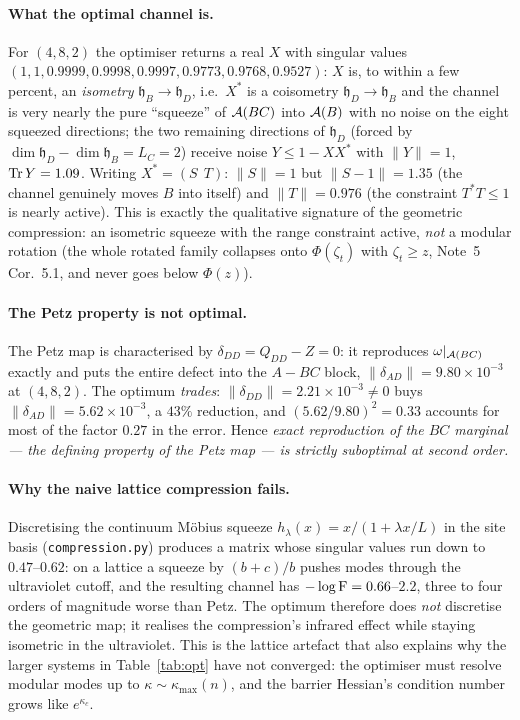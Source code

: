 \documentclass[11pt]{article}
\newcommand{\hh}{\mathfrak h}
\begin{document}
\paragraph{What the optimal channel is.}
For \((4,8,2)\) the optimiser returns a real \(X\) with singular values
\((1,1,0.9999,0.9998,0.9997,0.9773,0.9768,0.9527)\): \(X\) is, to within a few
percent, an \emph{isometry} \(\hh_B\to\hh_D\), i.e.\ \(X^*\) is a coisometry
\(\hh_D\to\hh_B\) and the channel is very nearly the pure ``squeeze'' of
\(\mathcal A(BC)\) into \(\mathcal A(B)\) with no noise on the eight squeezed directions;
the two remaining directions of \(\hh_D\) (forced by
\(\dim\hh_D-\dim\hh_B=L_C=2\)) receive noise \(Y\le1-XX^*\) with \(\|Y\|=1\),
\(\operatorname{Tr} Y=1.09\).  Writing \(X^*=(S\ \ T)\): \(\|S\|=1\) but
\(\|S-1\|=1.35\) (the channel genuinely moves \(B\) into itself) and
\(\|T\|=0.976\) (the constraint \(T^*T\le1\) is nearly active).  This is exactly
the qualitative signature of the geometric compression: an isometric squeeze
with the range constraint active, \emph{not} a modular rotation (the whole
rotated family collapses onto \(\Phi(\zeta_t)\) with \(\zeta_t\ge z\), Note~5
Cor.~5.1, and never goes below \(\Phi(z)\)).

\paragraph{The Petz property is not optimal.}
The Petz map is characterised by \(\delta_{DD}=Q_{DD}-Z=0\): it reproduces
\(\omega|_{\mathcal A(BC)}\) exactly and puts the entire defect into the \(A\!-\!BC\)
block, \(\|\delta_{AD}\|=9.80\times10^{-3}\) at \((4,8,2)\).  The optimum
\emph{trades}: \(\|\delta_{DD}\|=2.21\times10^{-3}\neq0\) buys
\(\|\delta_{AD}\|=5.62\times10^{-3}\), a \(43\%\) reduction, and
\((5.62/9.80)^2=0.33\) accounts for most of the factor \(0.27\) in the error.
Hence \emph{exact reproduction of the \(BC\) marginal --- the defining property
of the Petz map --- is strictly suboptimal at second order.}

\paragraph{Why the naive lattice compression fails.}
Discretising the continuum M\"obius squeeze \(h_\lambda(x)=x/(1+\lambda x/L)\) in
the site basis (\texttt{compression.py}) produces a matrix whose singular values
run down to \(0.47\)--\(0.62\): on a lattice a squeeze by \((b+c)/b\) pushes
modes through the ultraviolet cutoff, and the resulting channel has
\(-\log\operatorname{F}=0.66\)--\(2.2\), three to four orders of magnitude worse than Petz.
The optimum therefore does \emph{not} discretise the geometric map; it realises
the compression's infrared effect while staying isometric in the ultraviolet.
This is the lattice artefact that also explains why the larger systems in
Table~\ref{tab:opt} have not converged: the optimiser must resolve modular modes
up to \(\kappa\sim\kappa_{\max}(n)\), and the barrier Hessian's condition number
grows like \(e^{\kappa_c}\).
\end{document}
